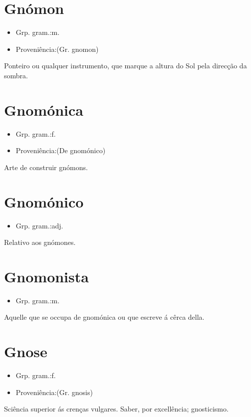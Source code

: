\section{Gnómon}
\begin{itemize}
\item {Grp. gram.:m.}
\end{itemize}
\begin{itemize}
\item {Proveniência:(Gr. \textunderscore gnomon\textunderscore )}
\end{itemize}
Ponteiro ou qualquer instrumento, que marque a altura do Sol pela direcção da sombra.
\section{Gnomónica}
\begin{itemize}
\item {Grp. gram.:f.}
\end{itemize}
\begin{itemize}
\item {Proveniência:(De \textunderscore gnomónico\textunderscore )}
\end{itemize}
Arte de construir gnómons.
\section{Gnomónico}
\begin{itemize}
\item {Grp. gram.:adj.}
\end{itemize}
Relativo aos gnómones.
\section{Gnomonista}
\begin{itemize}
\item {Grp. gram.:m.}
\end{itemize}
Aquelle que se occupa de gnomónica ou que escreve á cêrca della.
\section{Gnose}
\begin{itemize}
\item {Grp. gram.:f.}
\end{itemize}
\begin{itemize}
\item {Proveniência:(Gr. \textunderscore gnosis\textunderscore )}
\end{itemize}
Sciência superior ás crenças vulgares.
Saber, por excellência; gnosticismo.
